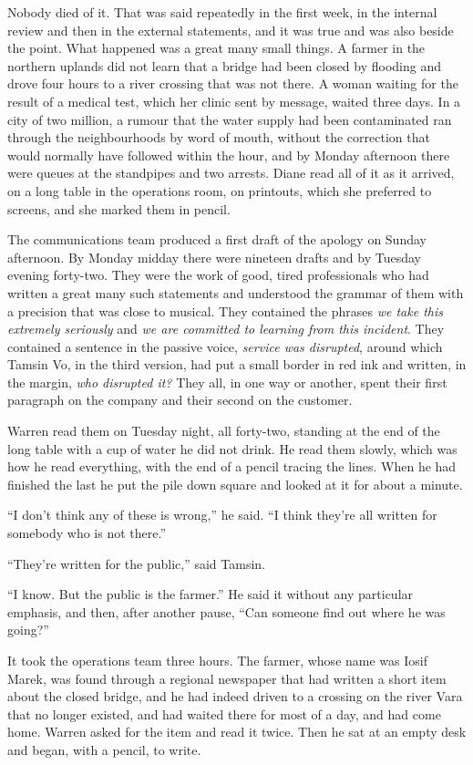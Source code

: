 Nobody died of it. That was said repeatedly in the first week, in the internal review and then in the external statements, and it was true and was also beside the point. What happened was a great many small things. A farmer in the northern uplands did not learn that a bridge had been closed by flooding and drove four hours to a river crossing that was not there. A woman waiting for the result of a medical test, which her clinic sent by message, waited three days. In a city of two million, a rumour that the water supply had been contaminated ran through the neighbourhoods by word of mouth, without the correction that would normally have followed within the hour, and by Monday afternoon there were queues at the standpipes and two arrests. Diane read all of it as it arrived, on a long table in the operations room, on printouts, which she preferred to screens, and she marked them in pencil.

The communications team produced a first draft of the apology on Sunday afternoon. By Monday midday there were nineteen drafts and by Tuesday evening forty-two. They were the work of good, tired professionals who had written a great many such statements and understood the grammar of them with a precision that was close to musical. They contained the phrases \emph{we take this extremely seriously} and \emph{we are committed to learning from this incident}. They contained a sentence in the passive voice, \emph{service was disrupted}, around which Tamsin Vo, in the third version, had put a small border in red ink and written, in the margin, \emph{who disrupted it?} They all, in one way or another, spent their first paragraph on the company and their second on the customer.

Warren read them on Tuesday night, all forty-two, standing at the end of the long table with a cup of water he did not drink. He read them slowly, which was how he read everything, with the end of a pencil tracing the lines. When he had finished the last he put the pile down square and looked at it for about a minute.

``I don't think any of these is wrong,'' he said. ``I think they're all written for somebody who is not there.''

``They're written for the public,'' said Tamsin.

``I know. But the public is the farmer.'' He said it without any particular emphasis, and then, after another pause, ``Can someone find out where he was going?''

It took the operations team three hours. The farmer, whose name was Iosif Marek, was found through a regional newspaper that had written a short item about the closed bridge, and he had indeed driven to a crossing on the river Vara that no longer existed, and had waited there for most of a day, and had come home. Warren asked for the item and read it twice. Then he sat at an empty desk and began, with a pencil, to write.


